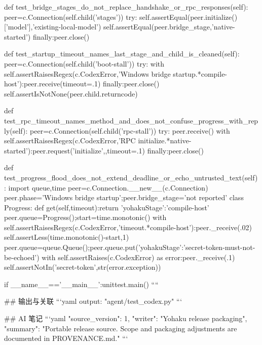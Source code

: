     def test_bridge_stages_do_not_replace_handshake_or_rpc_responses(self):
        peer=c.Connection(self.child('stages'))
        try:
            self.assertEqual(peer.initialize()['model'],'existing-local-model')
            self.assertEqual(peer.bridge_stage,'native-started')
        finally:peer.close()

    def test_startup_timeout_names_last_stage_and_child_is_cleaned(self):
        peer=c.Connection(self.child('boot-stall'))
        try:
            with self.assertRaisesRegex(c.CodexError,'Windows bridge startup.*compile-host'):peer.receive(timeout=.1)
        finally:peer.close()
        self.assertIsNotNone(peer.child.returncode)

    def test_rpc_timeout_names_method_and_does_not_confuse_progress_with_reply(self):
        peer=c.Connection(self.child('rpc-stall'))
        try:
            peer.receive()
            with self.assertRaisesRegex(c.CodexError,'RPC initialize.*native-started'):peer.request('initialize',{},timeout=.1)
        finally:peer.close()

    def test_progress_flood_does_not_extend_deadline_or_echo_untrusted_text(self):
        import queue,time
        peer=c.Connection.__new__(c.Connection)
        peer.phase='Windows bridge startup';peer.bridge_stage='not reported'
        class Progress:
            def get(self,timeout):return {'yohakuStage':'compile-host'}
        peer.queue=Progress();start=time.monotonic()
        with self.assertRaisesRegex(c.CodexError,'timeout.*compile-host'):peer._receive(.02)
        self.assertLess(time.monotonic()-start,1)
        peer.queue=queue.Queue();peer.queue.put({'yohakuStage':'secret-token-must-not-be-echoed'})
        with self.assertRaises(c.CodexError) as error:peer._receive(.1)
        self.assertNotIn('secret-token',str(error.exception))

if __name__=='__main__':unittest.main()
````

## 输出与关联
```yaml
output: "agent/test_codex.py"
```

## AI 笔记
```yaml
{"source_version": 1, "writer": "Yohaku release packaging", "summary": "Portable release source. Scope and packaging adjustments are documented in PROVENANCE.md."}
```
